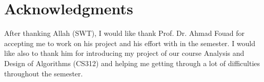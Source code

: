 \chapter*{Acknowledgments}
\label{chap:ack}
After thanking Allah (SWT), I would like thank Prof. Dr. Ahmad Fouad for accepting me to work on his project and his effort with in the semester. I would like also to thank him for introducing my project of our course Analysis and Design of Algorithms (CS312) and helping me getting through a lot of difficulties throughout the semester.